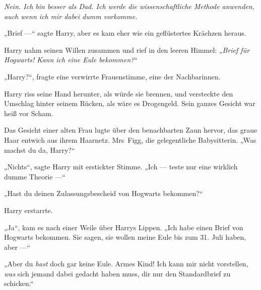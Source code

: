 \emph{Nein. Ich bin besser als Dad. Ich werde die wissenschaftliche Methode anwenden, auch wenn ich mir dabei dumm vorkomme.}

„Brief —“ sagte Harry, aber es kam eher wie ein geflüstertes Krächzen heraus.

Harry nahm seinen Willen zusammen und rief in den leeren Himmel: „\emph{Brief für Hogwarts! Kann ich eine Eule bekommen?}“

„Harry?“, fragte eine verwirrte Frauenstimme, eine der Nachbarinnen.

Harry riss seine Hand herunter, als würde sie brennen, und versteckte den Umschlag hinter seinem Rücken, als wäre es Drogengeld. Sein ganzes Gesicht war heiß vor Scham.

Das Gesicht einer alten Frau lugte über den benachbarten Zaun hervor, das graue Haar entwich aus ihrem Haarnetz. Mrs~Figg, die gelegentliche Babysitterin. „Was machst du da, Harry?“

„Nichts“, sagte Harry mit erstickter Stimme. „Ich — teste nur eine wirklich dumme Theorie —“

„Hast du deinen Zulassungsbescheid von Hogwarts bekommen?“

Harry erstarrte.

„Ja“, kam es nach einer Weile über Harrys Lippen. „Ich habe einen Brief von Hogwarts bekommen. Sie sagen, sie wollen meine Eule bis zum 31. Juli haben, aber —“

„Aber du \emph{hast} doch gar keine Eule. Armes Kind! Ich kann mir nicht vorstellen, \emph{was} sich jemand dabei gedacht haben muss, dir nur den Standardbrief zu schicken.“

